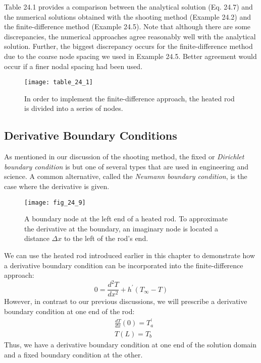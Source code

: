\documentclass[../main.tex]{subfiles}
\begin{document}
Table 24.1 provides a comparison between the analytical solution (Eq. 24.7) and the 
numerical solutions obtained with the shooting method (Example 24.2) and the finite-difference method (Example 24.5). Note that although there are some discrepancies, the
numerical approaches agree reasonably well with the analytical solution. Further, the biggest
discrepancy occurs for the finite-difference method due to the coarse node spacing we used
in Example 24.5. Better agreement would occur if a finer nodal spacing had been used.

\begin{figure}[H]
    \centering
    \texttt{[image: table\_24\_1]}
   \caption{\textsf{In order to implement the finite-difference approach, the heated rod is divided into a series of
   nodes.}}\label{tab:table_24_1} %
\end{figure}

\subsection{Derivative Boundary Conditions}

\noindent As mentioned in our discussion of the shooting method, the fixed or \textit{Dirichlet boundary condition} is but one of several types that are used in engineering and science. A common alternative, called the \textit{Neumann boundary condition}, is the case where the derivative is given.

\begin{figure}[H]
    \centering
    \texttt{[image: fig\_24\_9]}
   \caption{\textsf{A boundary node at the left end of a heated rod. To approximate the derivative at the boundary,
   an imaginary node is located a distance $\Delta x$ to the left of the rod's end.}}\label{fig:fig_24_9}
\end{figure}

We can use the heated rod introduced earlier in this chapter to demonstrate how a derivative boundary condition can be incorporated into the finite-difference approach:
$$
0=\frac{d^{2} T}{d x^{2}}+h^{\prime}\left(T_{\infty}-T\right)
$$
However, in contrast to our previous discussions, we will prescribe a derivative boundary condition at one end of the rod:
$$
\begin{aligned}
&\frac{d T}{d x}(0)=T_{a}^{\prime} \\
&T(L)=T_{b}
\end{aligned}
$$
Thus, we have a derivative boundary condition at one end of the solution domain and a fixed boundary condition at the other.
\end{document}
